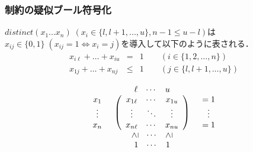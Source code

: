 \newcommand{\rgeq}{\rotatebox[origin=c]{90}{$\geq$}}
\newcommand{\req}{\rotatebox[origin=c]{90}{$=$}}
\begin{frame}\small
    \frametitle{\distinct 制約の疑似ブール符号化}
    \begin{block}{}
        $distinct(x_1 ... x_n) \; (x_i \in \{l, l+1, ..., u\}, n-1 \leq u-l)$は
        $x_{ij} \in \{0,1\} \; (x_{ij}=1 \Leftrightarrow x_i=j)$を導入して以下のように表される．
        \begin{eqnarray*}
            x_{i\ell}+\ldots+x_{iu}    &   =  & 1 \qquad (i \in \{1,2,\ldots,n\})\\
            x_{1j}+\ldots+x_{nj}  & \leq & 1 \qquad (j \in \{l,l+1,\ldots,u\})
        \end{eqnarray*}
    \end{block}
    \begin{exampleblock}{}
        \begin{displaymath}
            \begin{array}{ccc}
                        & \begin{array}{ccc}\ell      & \cdots & u \end{array}     &       \\
                \begin{array}{c}x_1\\\vdots\\x_n\end{array} & \left(
                    \begin{array}{ccc}
                        x_{1\ell} & \cdots & x_{1u}\\
                        \vdots    & \ddots & \vdots\\
                        x_{n\ell} & \cdots & x_{nu}
                    \end{array}
                \right) & \begin{array}{c}=1\\\vdots\\=1\end{array}\\
                        & \begin{array}{ccc}\rgeq       & \cdots & \rgeq \end{array}     &       \\
                        & \begin{array}{ccc}1      & \cdots & 1 \end{array}     &       
            \end{array}
        \end{displaymath}
    \end{exampleblock}
\end{frame}
